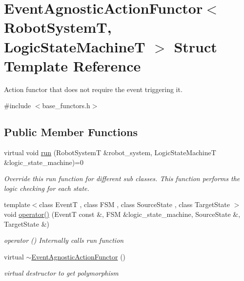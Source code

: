 \hypertarget{structEventAgnosticActionFunctor}{\section{Event\-Agnostic\-Action\-Functor$<$ Robot\-System\-T, Logic\-State\-Machine\-T $>$ Struct Template Reference}
\label{structEventAgnosticActionFunctor}
}


Action functor that does not require the event triggering it.  




{\ttfamily \#include $<$base\-\_\-functors.\-h$>$}

\subsection*{Public Member Functions}
\begin{DoxyCompactItemize}
\item 
virtual void \hyperlink{structEventAgnosticActionFunctor_a53a48938d68370ff2ef262222565ffcf}{run} (Robot\-System\-T \&robot\-\_\-system, Logic\-State\-Machine\-T \&logic\-\_\-state\-\_\-machine)=0
\begin{DoxyCompactList}\small\item\em Override this run function for different sub classes. This function performs the logic checking for each state. \end{DoxyCompactList}\item 
{\footnotesize template$<$class Event\-T , class F\-S\-M , class Source\-State , class Target\-State $>$ }\\void \hyperlink{structEventAgnosticActionFunctor_a3c0bcfed676d49c725ae987f37922534}{operator()} (Event\-T const \&, F\-S\-M \&logic\-\_\-state\-\_\-machine, Source\-State \&, Target\-State \&)
\begin{DoxyCompactList}\small\item\em operator () Internally calls run function \end{DoxyCompactList}\item 
virtual \hyperlink{structEventAgnosticActionFunctor_a446e93a5275bb3ba15f7f5577d06a0bf}{$\sim$\-Event\-Agnostic\-Action\-Functor} ()
\begin{DoxyCompactList}\small\item\em virtual destructor to get polymorphism \end{DoxyCompactList}\end{DoxyCompactItemize}


